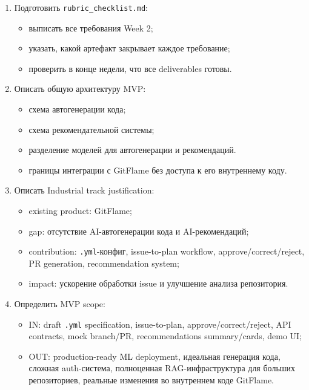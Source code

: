 \documentclass[12pt,a4paper]{article}
\begin{document}
\begin{enumerate}
    \item Подготовить \texttt{rubric\_checklist.md}:
    \begin{itemize}
        \item выписать все требования Week 2;
        \item указать, какой артефакт закрывает каждое требование;
        \item проверить в конце недели, что все deliverables готовы.
    \end{itemize}

    \item Описать общую архитектуру MVP:
    \begin{itemize}
        \item схема автогенерации кода;
        \item схема рекомендательной системы;
        \item разделение моделей для автогенерации и рекомендаций.
        \item границы интеграции с GitFlame без доступа к его внутреннему коду.
    \end{itemize}

    \item Описать Industrial track justification:
    \begin{itemize}
        \item existing product: GitFlame;
        \item gap: отсутствие AI-автогенерации кода и AI-рекомендаций;
        \item contribution: \texttt{.yml}-конфиг, issue-to-plan workflow, approve/correct/reject, PR generation, recommendation system;
        \item impact: ускорение обработки issue и улучшение анализа репозитория.
    \end{itemize}

    \item Определить MVP scope:
    \begin{itemize}
        \item IN: draft \texttt{.yml} specification, issue-to-plan, approve/correct/reject, API contracts, mock branch/PR, recommendations summary/cards, demo UI;
        \item OUT: production-ready ML deployment, идеальная генерация кода, сложная auth-система, полноценная RAG-инфраструктура для больших репозиториев, реальные изменения во внутреннем коде GitFlame.
    \end{itemize}


\end{enumerate}
\end{document}
